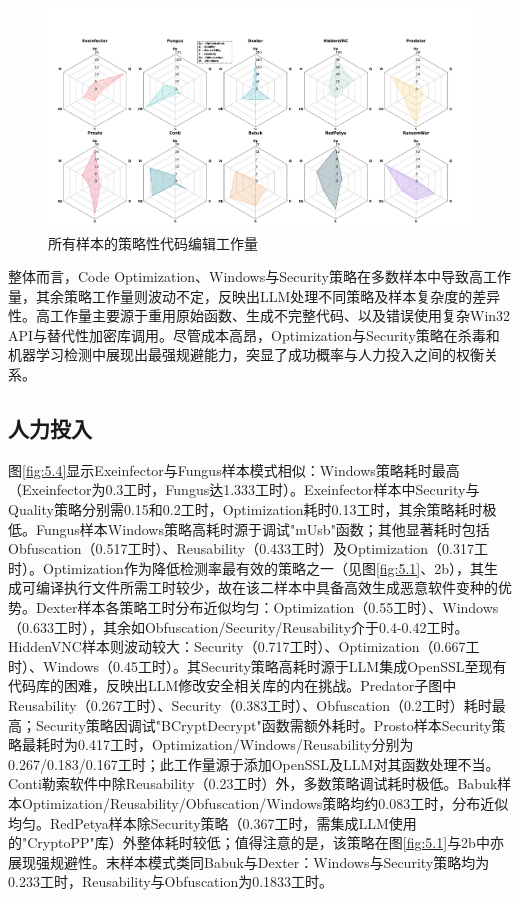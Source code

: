 \begin{figure}[htb]
	\centering
	\includegraphics[width=1.15\textwidth]{figures/figure3.png}
	\caption{所有样本的策略性代码编辑工作量}
	\label{fig:5.3}
\end{figure}

整体而言，Code Optimization、Windows与Security策略在多数样本中导致高工作量，其余策略工作量则波动不定，反映出LLM处理不同策略及样本复杂度的差异性。高工作量主要源于重用原始函数、生成不完整代码、以及错误使用复杂Win32 API与替代性加密库调用。尽管成本高昂，Optimization与Security策略在杀毒和机器学习检测中展现出最强规避能力，突显了成功概率与人力投入之间的权衡关系。

\subsection{人力投入}
图\ref{fig:5.4}显示Exeinfector与Fungus样本模式相似：Windows策略耗时最高（Exeinfector为0.3工时，Fungus达1.333工时）。Exeinfector样本中Security与Quality策略分别需0.15和0.2工时，Optimization耗时0.13工时，其余策略耗时极低。Fungus样本Windows策略高耗时源于调试"mUsb"函数；其他显著耗时包括Obfuscation（0.517工时）、Reusability（0.433工时）及Optimization（0.317工时）。Optimization作为降低检测率最有效的策略之一（见图\ref{fig:5.1}、2b），其生成可编译执行文件所需工时较少，故在该二样本中具备高效生成恶意软件变种的优势。Dexter样本各策略工时分布近似均匀：Optimization（0.55工时）、Windows（0.633工时），其余如Obfuscation/Security/Reusability介于0.4-0.42工时。HiddenVNC样本则波动较大：Security（0.717工时）、Optimization（0.667工时）、Windows（0.45工时）。其Security策略高耗时源于LLM集成OpenSSL至现有代码库的困难，反映出LLM修改安全相关库的内在挑战。Predator子图中Reusability（0.267工时）、Security（0.383工时）、Obfuscation（0.2工时）耗时最高；Security策略因调试"BCryptDecrypt"函数需额外耗时。Prosto样本Security策略最耗时为0.417工时，Optimization/Windows/Reusability分别为0.267/0.183/0.167工时；此工作量源于添加OpenSSL及LLM对其函数处理不当。Conti勒索软件中除Reusability（0.23工时）外，多数策略调试耗时极低。Babuk样本Optimization/Reusability/Obfuscation/Windows策略均约0.083工时，分布近似均匀。RedPetya样本除Security策略（0.367工时，需集成LLM使用的"CryptoPP"库）外整体耗时较低；值得注意的是，该策略在图\ref{fig:5.1}与2b中亦展现强规避性。末样本模式类同Babuk与Dexter：Windows与Security策略均为0.233工时，Reusability与Obfuscation为0.1833工时。


